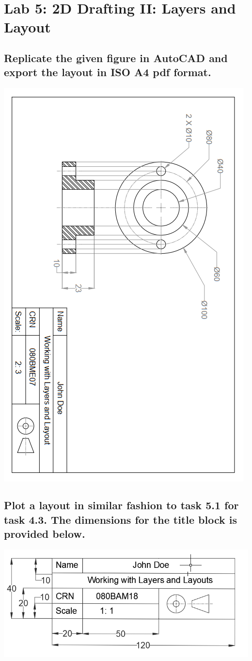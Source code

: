 \documentclass[a4paper, 12pt]{article}
\begin{document}
\section{Lab 5: 2D Drafting II: Layers and Layout}
\subsection{Replicate the given figure in AutoCAD and export the layout in ISO A4 pdf format.}
\begin{center}
	\includegraphics[scale = 0.8]{gfx/l5t1.PNG}
\end{center}
\subsection{Plot a layout in similar fashion to task 5.1 for task 4.3. The dimensions for the  title block is provided below.}
\begin{center}
	\includegraphics[scale = 0.7]{gfx/l5t2.PNG}
\end{center}
\end{document}
